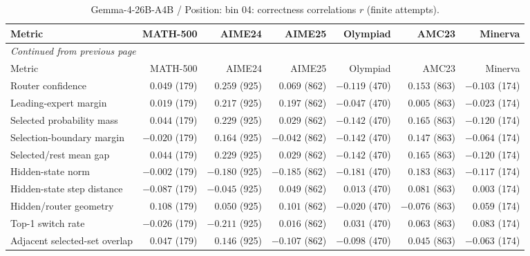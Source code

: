 \begingroup\scriptsize\setlength{\tabcolsep}{4pt}
\begin{longtable}{@{}lrrrrrr@{}}
\caption{Gemma-4-26B-A4B / Position: bin 04: correctness correlations $r$ (finite attempts).}\label{tab:multi-gemma-position-bin_04}\\
\toprule
Metric & MATH-500 & AIME24 & AIME25 & Olympiad & AMC23 & Minerva \\
\midrule\endfirsthead
\multicolumn{7}{l}{\textit{Continued from previous page}}\\
\toprule
Metric & MATH-500 & AIME24 & AIME25 & Olympiad & AMC23 & Minerva \\
\midrule\endhead
\bottomrule\endfoot
Router confidence & $0.049$ (179) & $0.259$ (925) & $0.069$ (862) & $-0.119$ (470) & $0.153$ (863) & $-0.103$ (174) \\
Leading-expert margin & $0.019$ (179) & $0.217$ (925) & $0.197$ (862) & $-0.047$ (470) & $0.005$ (863) & $-0.023$ (174) \\
Selected probability mass & $0.044$ (179) & $0.229$ (925) & $0.029$ (862) & $-0.142$ (470) & $0.165$ (863) & $-0.120$ (174) \\
Selection-boundary margin & $-0.020$ (179) & $0.164$ (925) & $-0.042$ (862) & $-0.142$ (470) & $0.147$ (863) & $-0.064$ (174) \\
Selected/rest mean gap & $0.044$ (179) & $0.229$ (925) & $0.029$ (862) & $-0.142$ (470) & $0.165$ (863) & $-0.120$ (174) \\
Hidden-state norm & $-0.002$ (179) & $-0.180$ (925) & $-0.185$ (862) & $-0.181$ (470) & $0.183$ (863) & $-0.117$ (174) \\
Hidden-state step distance & $-0.087$ (179) & $-0.045$ (925) & $0.049$ (862) & $0.013$ (470) & $0.081$ (863) & $0.003$ (174) \\
Hidden/router geometry & $0.108$ (179) & $0.050$ (925) & $0.101$ (862) & $-0.020$ (470) & $-0.076$ (863) & $0.059$ (174) \\
Top-1 switch rate & $-0.026$ (179) & $-0.211$ (925) & $0.016$ (862) & $0.031$ (470) & $0.063$ (863) & $0.083$ (174) \\
Adjacent selected-set overlap & $0.047$ (179) & $0.146$ (925) & $-0.107$ (862) & $-0.098$ (470) & $0.045$ (863) & $-0.063$ (174) \\
\end{longtable}\endgroup


